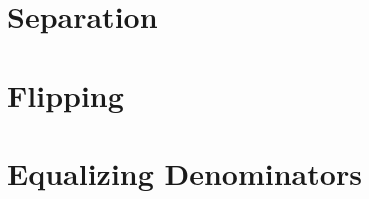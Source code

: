 \documentclass[inequalities.tex]{subfile}
\begin{document}
	\section{Separation}
	
	\section{Flipping}
	
	\section{Equalizing Denominators}
\end{document}
